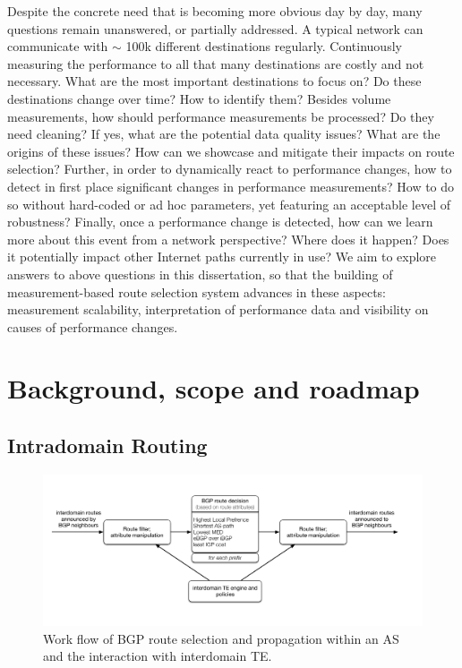 Despite the concrete need that is becoming more obvious day by day, many questions remain unanswered, or partially addressed.
A typical network can communicate with $\sim$ 100k different destinations regularly. 
Continuously measuring the performance to all that many destinations are costly and not necessary. 
What are the most important destinations to focus on? Do these destinations change over time? How to identify them?
Besides volume measurements, how should performance measurements be processed? Do they need cleaning?
If yes, what are the potential data quality issues? What are the origins of these issues? How can we showcase and mitigate their impacts on route selection?
Further, in order to dynamically react to performance changes, how to detect in first place significant changes in performance measurements? How to do so without hard-coded or ad hoc parameters, yet featuring an acceptable level of robustness?
Finally, once a performance change is detected, how can we learn more about this event from a network perspective? Where does it happen? Does it potentially impact other Internet paths currently in use? 
We aim to explore answers to above questions in this dissertation, so that the building of measurement-based route selection system advances in these aspects: measurement scalability, interpretation of performance data and visibility on causes of performance changes. 

\chapter{Background, scope and roadmap}
\section{Intradomain Routing}
\begin{figure}[!htb]
\centering
\includegraphics[width=1.3\textwidth]{gfx/chap1/bgp_decision.pdf}
\caption{Work flow of \acf{BGP} route selection and propagation within an \acf{AS} and the interaction with interdomain \acf{TE}.}
\label{fig:bgp_decision}
\end{figure}

